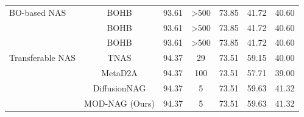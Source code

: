 \documentclass[aspectratio=169,xcolor=dvipsnames]{beamer}
\begin{document}
\begin{frame}
\begin{table}[h!]
\begin{tabular}{lS[table-format=2.2]cS[table-format=2.2]cS[table-format=2.2]c}
            \midrule
            {BO-based NAS}     & {BOHB}            & 93.61                    & >500                     & 73.85                    & 41.72                    & 40.60                       \\
                               & {BOHB}            & 93.61                    & >500                     & 73.85                    & 41.72                    & 40.60                       \\
                               & {BOHB}            & 93.61                    & >500                     & 73.85                    & 41.72                    & 40.60                       \\
            \midrule
            {Transferable NAS} & {TNAS}            & 94.37                    & 29                       & 73.51                    & 59.15                    & 40.00                       \\
                               & {MetaD2A}         & 94.37                    & 100                      & 73.51                    & 57.71                    & 39.00                       \\
                               & {DiffusionNAG}    & 94.37                    & 5                        & 73.51                    & 59.63                    & 41.32                       \\
                               & {MOD-NAG (Ours)}  & 94.37                    & 5                        & 73.51                    & 59.63                    & 41.32                       \\
            \bottomrule
        \end{tabular}
    \end{table}
\end{frame}
\end{document}
